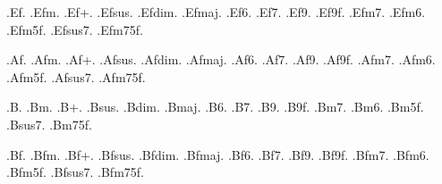%
%
.Ef.{}
.Efm.{}
.Ef+.{}
.Efsus.{}
.Efdim.{}
.Efmaj.{}
.Ef6.{}
.Ef7.{}
.Ef9.{}
.Ef9f.{}
.Efm7.{}
.Efm6.{}
.Efm5f.{}
.Efsus7.{}
.Efm75f.{}

%
%
.Af.{}
.Afm.{}
.Af+.{}
.Afsus.{}
.Afdim.{}
.Afmaj.{}
.Af6.{}
.Af7.{}
.Af9.{}
.Af9f.{}
.Afm7.{}
.Afm6.{}
.Afm5f.{}
.Afsus7.{}
.Afm75f.{}

%
%
.B.{}
.Bm.{}
.B+.{}
.Bsus.{}
.Bdim.{}
.Bmaj.{}
.B6.{}
.B7.{}
.B9.{}
.B9f.{}
.Bm7.{}
.Bm6.{}
.Bm5f.{}
.Bsus7.{}
.Bm75f.{}

%
%
.Bf.{}
.Bfm.{}
.Bf+.{}
.Bfsus.{}
.Bfdim.{}
.Bfmaj.{}
.Bf6.{}
.Bf7.{}
.Bf9.{}
.Bf9f.{}
.Bfm7.{}
.Bfm6.{}
.Bfm5f.{}
.Bfsus7.{}
.Bfm75f.{}
